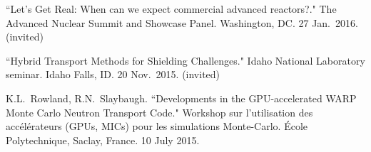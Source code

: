\begin{bibsection}
\item ``Let’s Get Real: When can we expect commercial
advanced reactors?." The Advanced Nuclear Summit and Showcase Panel. Washington, DC. 27 Jan.\ 2016. (invited)

\item ``Hybrid Transport Methods for Shielding Challenges." Idaho National Laboratory seminar. Idaho Falls, ID. 20 Nov.\ 2015. (invited) 

\item K.L.\ Rowland, R.N.\ Slaybaugh. ``Developments in the GPU-accelerated WARP Monte Carlo Neutron Transport Code." Workshop sur l'utilisation des acc\'{e}l\'{e}rateurs (GPUs, MICs) pour les simulations Monte-Carlo. \'{E}cole Polytechnique, Saclay, France. 10 July 2015. 









\end{bibsection}
